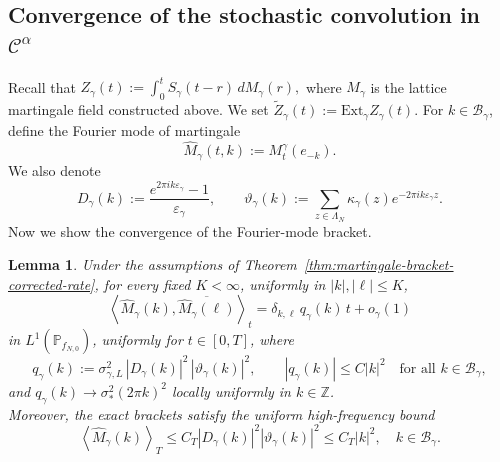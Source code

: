 \documentclass{article}
\newtheorem{lemma}{Lemma}
\begin{document}
\subsection{Convergence of the stochastic convolution in \(\mathcal C^\alpha\)}


Recall that
\(
Z_\gamma(t):=\int_0^t S_\gamma(t-r)\,dM_\gamma(r),
\)
where \(M_\gamma\) is the lattice martingale field constructed above.
We set
\(
\widetilde Z_\gamma(t):=\mathrm{Ext}_\gamma Z_\gamma(t).
\)
For \(k\in\mathcal B_\gamma\), define the Fourier mode of martingale
\[
\widehat M_\gamma(t,k):=M_t^\gamma(e_{-k}).
\]
We also denote
\[
D_\gamma(k):=\frac{e^{2\pi i k\varepsilon_\gamma}-1}{\varepsilon_\gamma},
\qquad
\vartheta_\gamma(k):=
\sum_{z\in\Lambda_N}\kappa_\gamma(z)e^{-2\pi i k\varepsilon_\gamma z}.
\]
Now we show the convergence of the Fourier-mode bracket.

\begin{lemma}\label{lem:Fourier-mode-bracket-final}
Under the assumptions of Theorem~\ref{thm:martingale-bracket-corrected-rate},
for every fixed \(K<\infty\), uniformly in
\(|k|,|\ell|\le K\),
\[
\left\langle \widehat M_\gamma(k),\overline{\widehat M_\gamma(\ell)}\right\rangle_t
=
\delta_{k,\ell}\,q_\gamma(k)\,t
+
o_\gamma(1)
\]
in \(L^1(\mathbb P_{f_{N,0}})\), uniformly for \(t\in[0,T]\), where
\[
q_\gamma(k)
:=
\sigma_{\gamma,L}^2\,|D_\gamma(k)|^2\,|\vartheta_\gamma(k)|^2,
\qquad
|q_\gamma(k)|\le C|k|^2
\quad\text{for all }k\in\mathcal B_\gamma,
\]
and
\(
q_\gamma(k) \rightarrow \sigma_*^2(2\pi k)^2
\)
locally uniformly in \(k\in\mathbb Z\).\\
Moreover, the exact brackets satisfy the uniform high-frequency bound
\begin{equation}\label{eq:fourier-mode-bracket-uniform-bound}
\left\langle \widehat M_\gamma(k)\right\rangle_T
\le C_T |D_\gamma(k)|^2|\vartheta_\gamma(k)|^2
\le C_T |k|^2,
\quad k\in\mathcal B_\gamma.
\end{equation}
\end{lemma}
\end{document}
